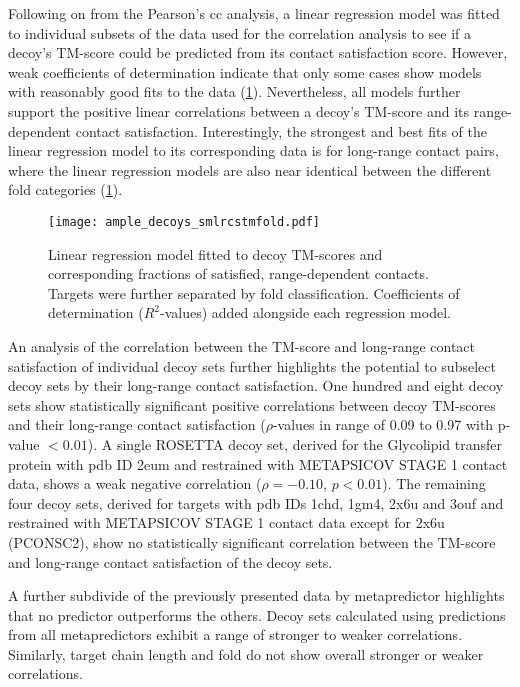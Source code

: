 Following on from the Pearson's \gls{cc} analysis, a linear regression model was fitted to individual subsets of the data used for the correlation analysis to see if a decoy's TM-score could be predicted from its contact satisfaction score. However, weak coefficients of determination indicate that only some cases show models with reasonably good fits to the data (\cref{fig:ample_decoys_smlrcstmfold}). Nevertheless, all models further support the positive linear correlations between a decoy's TM-score and its range-dependent contact satisfaction. Interestingly, the strongest and best fits of the linear regression model to its corresponding data is for long-range contact pairs, where the linear regression models are also near identical between the different fold categories (\cref{fig:ample_decoys_smlrcstmfold}).

\begin{figure}[H]
	\centering
	\texttt{[image: ample\_decoys\_smlrcstmfold.pdf]}
        \caption[Regression model between decoy TM-score and contact satisfaction]{Linear regression model fitted to decoy TM-scores and corresponding fractions of satisfied, range-dependent contacts. Targets were further separated by fold classification. Coefficients of determination ($R^2$-values) added alongside each regression model.}
	\label{fig:ample_decoys_smlrcstmfold}
\end{figure}

An analysis of the correlation between the TM-score and long-range contact satisfaction of individual decoy sets further highlights the potential to subselect decoy sets by their long-range contact satisfaction. One hundred and eight decoy sets show statistically significant positive correlations between decoy TM-scores and their long-range contact satisfaction ($\rho$-values in range of 0.09 to 0.97 with p-value $<0.01$). A single ROSETTA decoy set, derived for the Glycolipid transfer protein with \gls{pdb} ID 2eum and restrained with METAPSICOV STAGE 1 contact data, shows a weak negative correlation ($\rho=-0.10$, $p<0.01$). The remaining four decoy sets, derived for targets with \gls{pdb} IDs 1chd, 1gm4, 2x6u and 3ouf and restrained with METAPSICOV STAGE 1 contact data except for 2x6u (PCONSC2), show no statistically significant correlation between the TM-score and long-range contact satisfaction of the decoy sets. 

A further subdivide of the previously presented data by metapredictor highlights that no predictor outperforms the others. Decoy sets calculated using predictions from all metapredictors exhibit a range of stronger to weaker correlations. Similarly, target chain length and fold do not show overall stronger or weaker correlations. 

